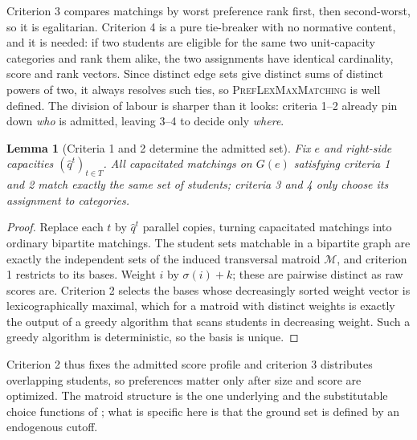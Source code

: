 \documentclass[a4paper,twoside]{article}
\newtheorem{lemma}{Lemma}
\theoremstyle{definition}
\begin{document}
Criterion 3 compares matchings by worst preference rank first, then second-worst, so it is egalitarian. Criterion 4 is a pure tie-breaker with no normative content, and it is needed: if two students are eligible for the same two unit-capacity categories and rank them alike, the two assignments have identical cardinality, score and rank vectors. Since distinct edge sets give distinct sums of distinct powers of two, it always resolves such ties, so \textsc{PrefLexMaxMatching} is well defined. The division of labour is sharper than it looks: criteria 1--2 already pin down \emph{who} is admitted, leaving 3--4 to decide only \emph{where}.

\begin{lemma}[Criteria 1 and 2 determine the admitted set]
\label{lem:matroid}
Fix $e$ and right-side capacities $(\hat q^t)_{t\in T}$. All capacitated matchings on $G(e)$ satisfying criteria 1 and 2 match exactly the same set of students; criteria 3 and 4 only choose its assignment to categories.
\end{lemma}

\begin{proof}
Replace each $t$ by $\hat q^t$ parallel copies, turning capacitated matchings into ordinary bipartite matchings. The student sets matchable in a bipartite graph are exactly the independent sets of the induced transversal matroid $\mathcal{M}$, and criterion 1 restricts to its bases. Weight $i$ by $\sigma(i)+k$; these are pairwise distinct as raw scores are. Criterion 2 selects the bases whose decreasingly sorted weight vector is lexicographically maximal, which for a matroid with distinct weights is exactly the output of a greedy algorithm that scans students in decreasing weight. Such a greedy algorithm is deterministic, so the basis is unique.
\end{proof}

Criterion 2 thus fixes the admitted score profile and criterion 3 distributes overlapping students, so preferences matter only after size and score are optimized. The matroid structure is the one underlying \cite{Flei03a} and the substitutable choice functions of \cite{GKK+17a,KoSo16a}; what is specific here is that the ground set is defined by an endogenous cutoff.
\end{document}
